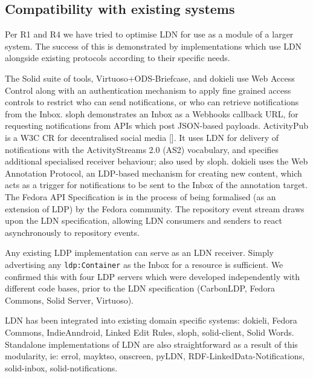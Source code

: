 \documentclass[a4paper]{llncs}
\begin{document}
                                \subsection{Compatibility with existing systems}
  \label{compatibility-with-existing-systems}



\par Per \empty R1 and \empty R4 we have tried to optimise LDN for use as a module of a larger system. The success of this is demonstrated by implementations which use LDN alongside existing protocols according to their specific needs.


\par The Solid suite of tools, Virtuoso+ODS-Briefcase, and dokieli use \empty Web Access Control along with an authentication mechanism to apply fine grained access controls to restrict who can send notifications, or who can retrieve notifications from the Inbox. sloph demonstrates an Inbox as a \empty Webhooks callback URL, for requesting notifications from APIs which post JSON-based payloads. \empty ActivityPub is a W3C CR for decentralised social media []. It uses LDN for delivery of notifications with the \empty ActivityStreams 2.0 (AS2) vocabulary, and specifies additional specialised receiver behaviour; also used by sloph. dokieli uses the \empty Web Annotation Protocol, an LDP-based mechanism for creating new content, which acts as a trigger for notifications to be sent to the Inbox of the annotation target. The \empty Fedora API Specification is in the process of being formalised (as an extension of LDP) by the Fedora community. The repository event stream draws upon the LDN specification, allowing LDN consumers and senders to react asynchronously to repository events.


\par Any existing LDP implementation can serve as an LDN receiver. Simply advertising any {\tt ldp:Container} as the Inbox for a resource is sufficient. We confirmed this with four LDP servers which were developed independently with different code bases, prior to the LDN specification (CarbonLDP, Fedora Commons, Solid Server, Virtuoso).


\par LDN has been integrated into existing domain specific systems: dokieli, Fedora Commons, IndieAnndroid, Linked Edit Rules, sloph, solid-client, Solid Words. Standalone implementations of LDN are also straightforward as a result of this modularity, ie: errol, mayktso, onscreen, pyLDN, RDF-LinkedData-Notifications, solid-inbox, solid-notifications.
\end{document}
